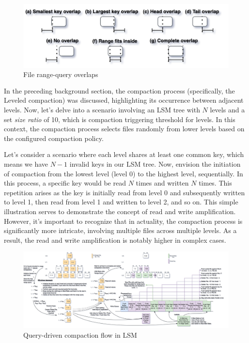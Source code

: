\begin{figure}
    \includegraphics[scale=0.2]{Figures/File range overlaps.png}
    \caption{File range-query overlaps}\label{fig:file_range_overlaps}
\end{figure}

In the preceding background section, the compaction process (specifically, the Leveled compaction) was discussed, 
highlighting its occurrence between adjacent levels. Now, let's delve into a scenario involving an LSM tree with $N$ 
levels and a set \textit{size ratio} of 10, which is compaction triggering threshold for levels. In this context, the compaction process selects files randomly from lower 
levels based on the configured compaction policy.

Let's consider a scenario where each level shares at least one common key, which means we have $N-1$ invalid keys in our 
LSM tree. Now, envision the 
initiation of compaction from the lowest level (level 0) to the highest level, sequentially. In this process, a 
specific key would be read $N$ times and written $N$ times. This repetition arises as the key is initially read from 
level 0 and subsequently written to level 1, then read from level 1 and written to level 2, and so on. This simple 
illustration serves to demonstrate the concept of read and write amplification. However, it's important to recognize 
that in actuality, the compaction process is significantly more intricate, involving multiple files across multiple 
levels. As a result, the read and write amplification is notably higher in complex cases.

\begin{figure}
    \includegraphics[scale=0.10]{Figures/RQ-driven numeric key sorting.png}
    \caption{Query-driven compaction flow in LSM}\label{fig:query-driven_compaction}
\end{figure}

